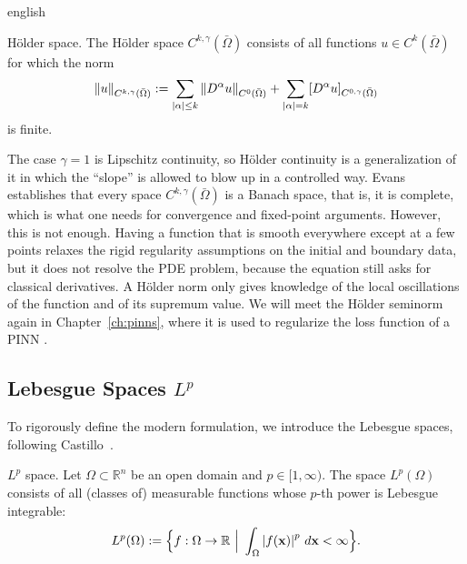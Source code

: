 \documentclass[0000.tex]{subfiles}
\begin{document}
\begin{hyphenrules}{english}
\begin{definicion}{Hölder space.}\label{def:holder-space}
The Hölder space $C^{k,\gamma}(\bar\Omega)$ consists of all functions $u\in C^k(\bar\Omega)$ for which
the norm
\begin{equation}
  \left\lVert u \right\rVert_{C^{k,\gamma}(\bar\Omega)}:=\sum_{\left\lvert \alpha \right\rvert\le k}\left\lVert D^\alpha u \right\rVert_{C^0(\bar\Omega)}
  +\sum_{\left\lvert \alpha \right\rvert=k}[D^\alpha u]_{C^{0,\gamma}(\bar\Omega)}
  \label{eq:holder-norm}
\end{equation}
is finite.
\end{definicion}

The case $\gamma=1$ is Lipschitz continuity, so Hölder continuity is a generalization of it in which the
``slope'' is allowed to blow up in a controlled way. Evans~\cite{evans2010} establishes that every space
$C^{k,\gamma}(\bar\Omega)$ is a Banach space, that is, it is complete, which is what one needs for
convergence and fixed-point arguments. However, this is not enough. Having a function that is smooth
everywhere except at a few points relaxes the rigid regularity assumptions on the initial and boundary
data, but it does not resolve the PDE problem, because the equation still asks for classical
derivatives. A Hölder norm only gives knowledge of the local oscillations of the function and of its
supremum value. We will meet the Hölder seminorm again in Chapter~\ref{ch:pinns}, where it is used to
regularize the loss function of a PINN \cite{shin2020convergence}.

\subsection{Lebesgue Spaces \texorpdfstring{$L^p$}{Lp}}\label{subsec:lp}

To rigorously define the modern formulation, we introduce the Lebesgue spaces, following
Castillo~\cite{castillo2014}.

\begin{definicion}{$L^p$ space.}\label{def:lp}
Let $\Omega\subset\mathbb{R}^n$ be an open domain and $p\in[1,\infty)$. The space $L^p(\Omega)$ consists of all
(classes of) measurable functions whose $p$-th power is Lebesgue integrable:
\begin{equation}
  L^p(\Omega):=\Big\{f:\Omega\to\mathbb{R}\ \Big|\ \int_\Omega\abs{f(\mathbf{x})}^p\,d\mathbf{x}<\infty\Big\}.
  \label{eq:lp}
\end{equation}
\end{definicion}


\end{hyphenrules}
\end{document}
